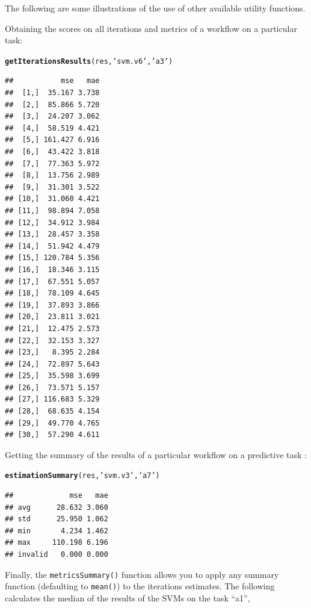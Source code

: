 \documentclass[10pt,a4paper]{article}\usepackage[]{graphicx}\usepackage[]{color}
\makeatletter
\newcommand{\hlstr}[1]{\textcolor[rgb]{0.192,0.494,0.8}{#1}}%
\newcommand{\hlstd}[1]{\textcolor[rgb]{0.345,0.345,0.345}{#1}}%
\newcommand{\hlkwd}[1]{\textcolor[rgb]{0.737,0.353,0.396}{\textbf{#1}}}%
\newenvironment{kframe}{%
 \def\at@end@of@kframe{}%
 \ifinner\ifhmode%
  \def\at@end@of@kframe{\end{minipage}}%
  \begin{minipage}{\columnwidth}%
 \fi\fi%
 \def\FrameCommand##1{\hskip\@totalleftmargin \hskip-\fboxsep
 \colorbox{shadecolor}{##1}\hskip-\fboxsep
     \hskip-\linewidth \hskip-\@totalleftmargin \hskip\columnwidth}%
 \MakeFramed {\advance\hsize-\width
   \@totalleftmargin\z@ \linewidth\hsize
   \@setminipage}}%
 {\par\unskip\endMakeFramed%
 \at@end@of@kframe}
\newenvironment{knitrout}{}{} %
\makeatother
\begin{document}
The following are some illustrations of the use of other available
utility functions.

Obtaining the scores on all iterations and metrics of a workflow on a
particular task:

\begin{knitrout}
\color{fgcolor}\begin{kframe}
\begin{alltt}
\hlkwd{getIterationsResults}\hlstd{(res,}\hlstr{'svm.v6'}\hlstd{,}\hlstr{'a3'}\hlstd{)}
\end{alltt}
\begin{verbatim}
##           mse   mae
##  [1,]  35.167 3.738
##  [2,]  85.866 5.720
##  [3,]  24.207 3.062
##  [4,]  58.519 4.421
##  [5,] 161.427 6.916
##  [6,]  43.422 3.818
##  [7,]  77.363 5.972
##  [8,]  13.756 2.989
##  [9,]  31.301 3.522
## [10,]  31.060 4.421
## [11,]  98.894 7.058
## [12,]  34.912 3.984
## [13,]  28.457 3.358
## [14,]  51.942 4.479
## [15,] 120.784 5.356
## [16,]  18.346 3.115
## [17,]  67.551 5.057
## [18,]  78.109 4.645
## [19,]  37.893 3.866
## [20,]  23.811 3.021
## [21,]  12.475 2.573
## [22,]  32.153 3.327
## [23,]   8.395 2.284
## [24,]  72.897 5.643
## [25,]  35.598 3.699
## [26,]  73.571 5.157
## [27,] 116.683 5.329
## [28,]  68.635 4.154
## [29,]  49.770 4.765
## [30,]  57.290 4.611
\end{verbatim}
\end{kframe}
\end{knitrout}


Getting the summary of the results of a particular workflow on a  predictive task :

\begin{knitrout}
\color{fgcolor}\begin{kframe}
\begin{alltt}
\hlkwd{estimationSummary}\hlstd{(res,}\hlstr{'svm.v3'}\hlstd{,}\hlstr{'a7'}\hlstd{)}
\end{alltt}
\begin{verbatim}
##             mse   mae
## avg      28.632 3.060
## std      25.950 1.062
## min       4.234 1.462
## max     110.198 6.196
## invalid   0.000 0.000
\end{verbatim}
\end{kframe}
\end{knitrout}


Finally, the \texttt{metricsSummary()} function allows you to apply any
summary function (defaulting to \texttt{mean()}) to the iterations estimates. The following
calculates the median of the results of the SVMs on the task ``a1'',
\end{document}
